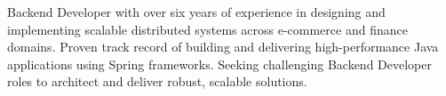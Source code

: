 Backend Developer with over six years of experience in designing and implementing scalable distributed systems across e-commerce and finance domains. Proven track record of building and delivering high-performance Java applications using Spring frameworks. Seeking challenging Backend Developer roles to architect and deliver robust, scalable solutions.

